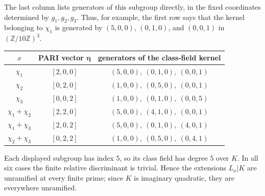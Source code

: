 \documentclass[11pt]{article}
\begin{document}
The last column lists generators of this subgroup directly, in the fixed
coordinates determined by $g_1,g_2,g_3$.  Thus, for
example, the first row says that the kernel belonging to $\chi_1$ is generated by
$(5,0,0)$, $(0,1,0)$, and $(0,0,1)$ in
$(\mathbb Z/10\mathbb Z)^3$.
\begin{center}
\begin{tabular}{c c c}
\toprule
$x$ & PARI vector $\boldsymbol{\eta}$ & generators of the class-field kernel \\
\midrule
$\chi_1$ & $[2,0,0]$ & $(5,0,0),\ (0,1,0),\ (0,0,1)$ \\
$\chi_2$ & $[0,2,0]$ & $(1,0,0),\ (0,5,0),\ (0,0,1)$ \\
$\chi_3$ & $[0,0,2]$ & $(1,0,0),\ (0,1,0),\ (0,0,5)$ \\
$\chi_1{+}\chi_2$ & $[2,2,0]$ & $(5,0,0),\ (4,1,0),\ (0,0,1)$ \\
$\chi_1{+}\chi_3$ & $[2,0,2]$ & $(5,0,0),\ (0,1,0),\ (4,0,1)$ \\
$\chi_2{+}\chi_3$ & $[0,2,2]$ & $(1,0,0),\ (0,5,0),\ (0,4,1)$ \\
\bottomrule
\end{tabular}
\end{center}
Each displayed subgroup has index $5$, so its class field has degree $5$ over
$K$.  In all six cases the finite relative discriminant is trivial.  Hence the
extensions $L_x| K$ are unramified at every finite prime; since $K$ is
imaginary quadratic, they are everywhere unramified.
\end{document}
